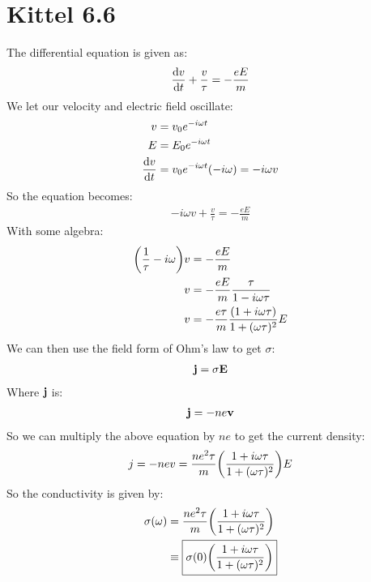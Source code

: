 \documentclass[12pt]{article}
\begin{document}
\section*{Kittel 6.6}
The differential equation is given as:
\begin{align*}
  \dv{v}{t}+\frac{v}{\tau}=-\frac{eE}{m}
\end{align*}
We let our velocity and electric field oscillate:
\begin{align*}
  v&=v_0e^{-i\omega t}\\
  E&=E_0e^{-i\omega t}\\
  \dv{v}{t}&=v_0e^{-i\omega t}(-i\omega)=-i\omega v
\end{align*}
So the equation becomes:
\begin{align*}
  -i\omega v +\frac{v}{\tau}=-\frac{eE}{m}
\end{align*}
With some algebra:
\begin{align*}
  \qty(\frac{1}{\tau}-i\omega)v&=-\frac{eE}{m}\\
  v&=-\frac{eE}{m}\frac{\tau}{1-i\omega\tau}\\
  v&=-\frac{e\tau}{m}\frac{\qty(1+i\omega\tau)}{1+(\omega\tau)^2}E\\
\end{align*}
We can then use the field form of Ohm's law to get $\sigma$:
\begin{align*}
  \vb{j}=\sigma \vb{E}
\end{align*}
Where $\vb{j}$ is:
\begin{align*}
  \vb{j}=-ne\vb{v}
\end{align*}
So we can multiply the above equation by $ne$ to get the current density:
\begin{align*}
  j=-nev=\frac{ne^2\tau}{m}\qty(\frac{1+i\omega\tau}{1+(\omega\tau)^2})E
\end{align*}
So the conductivity is given by:
\begin{align*}
  \sigma(\omega)&=\frac{ne^2\tau}{m}\qty(\frac{1+i\omega\tau}{1+(\omega\tau)^2})\\
  &\equiv\boxed{\sigma(0)\qty(\frac{1+i\omega\tau}{1+(\omega\tau)^2})}
\end{align*}
\end{document}
